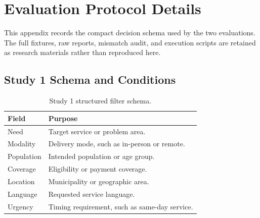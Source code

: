 \documentclass[journal,article,submit,moreauthors]{Definitions/mdpi}
\begin{document}





\appendixstart
\appendix
\section{Evaluation Protocol Details}\label{app:evaluation_protocol}

This appendix records the compact decision schema used by the two evaluations. The full fixtures, raw reports, mismatch audit, and execution scripts are retained as research materials rather than reproduced here.

\subsection{Study 1 Schema and Conditions}
\begin{table}[H]
\caption{Study 1 structured filter schema.}
\label{tab:appendix_study1_schema}
\small
\begin{tabularx}{\textwidth}{@{}p{2.3cm}X@{}}
\toprule
\textbf{Field} & \textbf{Purpose} \\
\midrule
Need & Target service or problem area. \\
Modality & Delivery mode, such as in-person or remote. \\
Population & Intended population or age group. \\
Coverage & Eligibility or payment coverage. \\
Location & Municipality or geographic area. \\
Language & Requested service language. \\
Urgency & Timing requirement, such as same-day service. \\
\bottomrule
\end{tabularx}
\end{table}
\end{document}
